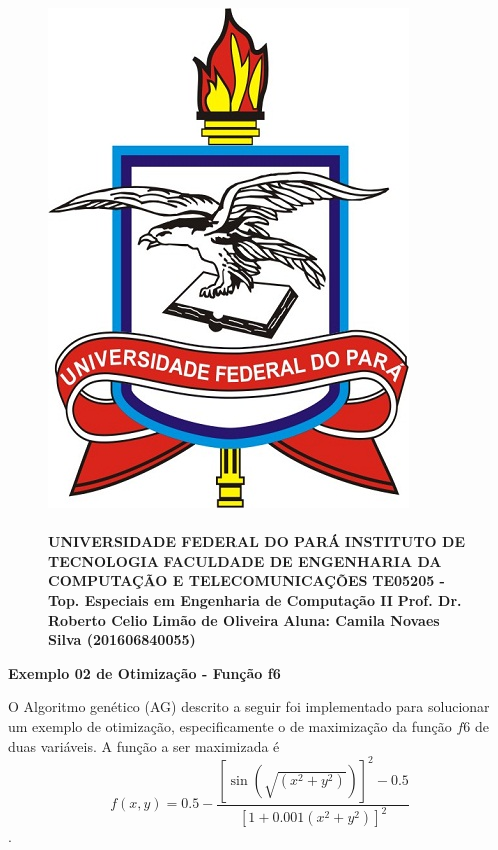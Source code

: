 \documentclass[12pt]{article}
\title{}
\date{}
\begin{document}
\begin{figure}
		\begin{minipage}{.3\linewidth}
			\centering
			\includegraphics[width=.6\linewidth]{imgs/ufpa.jpg}
		\end{minipage}
		\begin{minipage}{.70\linewidth}
			\flushleft
			\paragraph{}
			\textbf{ }\newline
			\textbf{UNIVERSIDADE FEDERAL DO PARÁ} \newline
			\textbf{INSTITUTO DE TECNOLOGIA} \newline
			\textbf{FACULDADE DE ENGENHARIA DA COMPUTAÇÃO E TELECOMUNICAÇÕES} \newline
			\textbf{TE05205 - Top. Especiais em Engenharia de Computação II} \newline
            \textbf{Prof. Dr. Roberto Celio Limão de Oliveira} \newline
            \textbf{Aluna: Camila Novaes Silva (201606840055)}
		\end{minipage}
\end{figure}
\FloatBarrier
\begin{center}
    {\Large \textbf{Exemplo 02 de Otimização - Função f6}}
\end{center}
\hfill

O Algoritmo genético (AG) descrito a seguir foi implementado para solucionar um exemplo
de otimização, especificamente o de maximização da função $f6$ de duas variáveis. A função a ser
maximizada é
$$f(x,y) = 0.5 - \frac{[\sin(\sqrt{(x^2 + y^2)})]^2 - 0.5}{[1 + 0.001(x^2 + y^2)]^2}$$.
\end{document}
